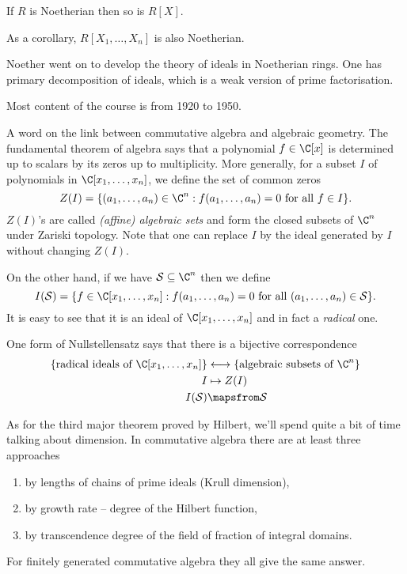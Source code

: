 \documentclass[a4paper]{article}
\begin{document}
\begin{theorem}
  If \(R\) is Noetherian then so is \(R[X]\).
\end{theorem}
As a corollary, \(R[X_1, \dots, X_n]\) is also Noetherian.

Noether went on to develop the theory of ideals in Noetherian rings. One has primary decomposition of ideals, which is a weak version of prime factorisation.

Most content of the course is from 1920 to 1950.

A word on the link between commutative algebra and algebraic geometry. The fundamental theorem of algebra says that a polynomial \(f \in \C[x]\) is determined up to scalars by its zeros up to multiplicity. More generally, for a subset \(I\) of polynomials in \(\C[x_1, \dots, x_n]\), we define the set of common zeros
\[
  Z(I) = \{(a_1, \dots, a_n) \in \C^n: f(a_1, \dots, a_n) = 0 \text{ for all } f \in I\}.
\]
\(Z(I)\)'s are called \emph{(affine) algebraic sets} and form the closed subsets of \(\C^n\) under Zariski topology. Note that one can replace \(I\) by the ideal generated by \(I\) without changing \(Z(I)\).

On the other hand, if we have \(\mathcal S \subseteq \C^n\) then we define
\[
  I(\mathcal S) = \{f \in \C[x_1, \dots, x_n]: f(a_1, \dots, a_n) = 0 \text{ for all } (a_1, \dots, a_n) \in \mathcal S\}.
\]
It is easy to see that it is an ideal of \(\C[x_1, \dots, x_n]\) and in fact a \emph{radical} one.

One form of Nullstellensatz says that there is a bijective correspondence
\begin{align*}
  \{\text{radical ideals of } \C[x_1, \dots, x_n]\} &\longleftrightarrow \{\text{algebraic subsets of } \C^n\} \\
  I &\mapsto Z(I) \\
  I(\mathcal S) &\mapsfrom \mathcal S
\end{align*}

As for the third major theorem proved by Hilbert, we'll spend quite a bit of time talking about dimension. In commutative algebra there are at least three approaches
\begin{enumerate}
\item by lengths of chains of prime ideals (Krull dimension),
\item by growth rate -- degree of the Hilbert function,
\item by transcendence degree of the field of fraction of integral domains.
\end{enumerate}
For finitely generated commutative algebra they all give the same answer.
\end{document}
